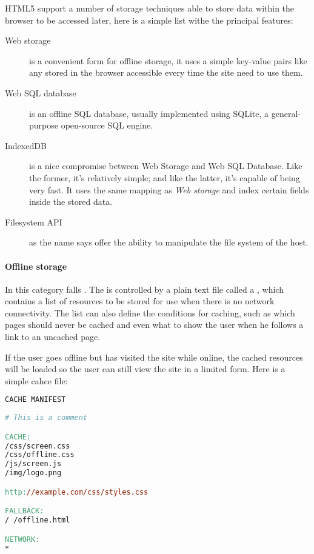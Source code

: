 \ac{HTML}5 support a number of storage techniques able to store data within the
browser to be accessed later, here is a simple list withe the principal features:
\begin{description}
	\item[Web storage] is a convenient form for offline storage, it uses a simple
	key-value pairs like any \js{}  stored in the browser accessible
	every time the site need to use them.

	\item[Web SQL database] is an offline SQL database, usually implemented using
	SQLite, a general-purpose open-source SQL engine.

	\item[IndexedDB] is a nice compromise between Web Storage and Web SQL Database.
	Like the former, it's relatively simple; and like the latter, it's capable
	of being very fast. It uses the same mapping as \emph{Web storage} and index
	certain fields inside the stored data.

	\item[Filesystem API] as the name says offer the ability to manipulate the
	file system of the host.
\end{description}


\paragraph{Offline storage}
In this category falls . The  is
controlled by a plain text file called a , which contains a list
of resources to be stored for use when there is no network connectivity. The list
can also define the conditions for caching, such as which pages should never be
cached and even what to show the user when he follows a link to an uncached page.

If the user goes offline but has visited the site while online, the cached
resources will be loaded so the user can still view the site in a limited form.
Here is a simple cahce file:
\begin{lstlisting}[language=make]
CACHE MANIFEST
      
# This is a comment

CACHE:
/css/screen.css
/css/offline.css
/js/screen.js
/img/logo.png

http://example.com/css/styles.css

FALLBACK:
/ /offline.html

NETWORK:
*
\end{lstlisting}